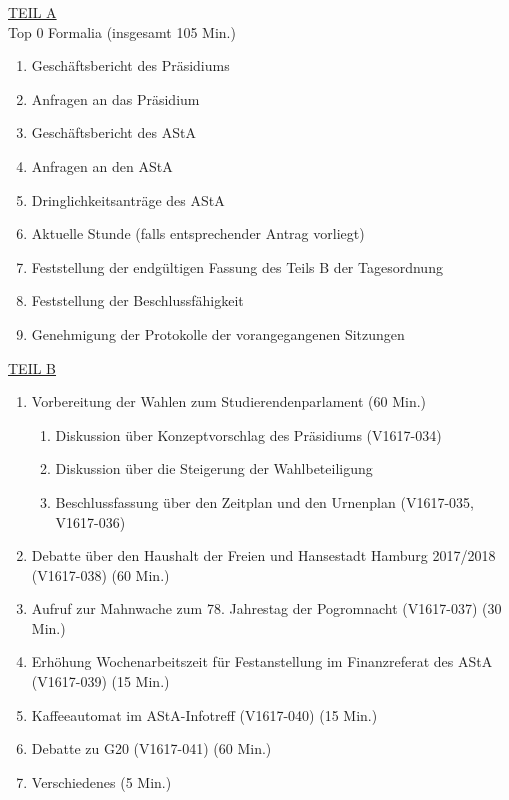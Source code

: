 \documentclass[ngerman,headheight=70pt]{scrartcl}
\begin{document}
    \underline{TEIL A}\\
    Top 0 Formalia (insgesamt 105 Min.)
    \begin{enumerate}
        \item Geschäftsbericht des Präsidiums
        \item Anfragen an das Präsidium
        \item Geschäftsbericht des AStA
        \item Anfragen an den AStA
        \item Dringlichkeitsanträge des AStA
        \item Aktuelle Stunde (falls entsprechender Antrag vorliegt)
        \item Feststellung der endgültigen Fassung des Teils B der Tagesordnung
        \item Feststellung der Beschlussfähigkeit
        \item Genehmigung der Protokolle der vorangegangenen Sitzungen
    \end{enumerate}
    \underline{TEIL B}\\
    \begin{enumerate}[label={\textbf{Top \theenumi}},leftmargin=*]
        \item Vorbereitung der Wahlen zum Studierendenparlament (60 Min.)
        \begin{enumerate}
            \item Diskussion über Konzeptvorschlag des Präsidiums (V1617-034)
            \item Diskussion über die Steigerung der Wahlbeteiligung
            \item Beschlussfassung über den Zeitplan und den Urnenplan
            (V1617-035, V1617-036)
        \end{enumerate}
        \item Debatte über den Haushalt der Freien und Hansestadt Hamburg
              2017/2018 (V1617-038) (60 Min.)
        \item Aufruf zur Mahnwache zum 78. Jahrestag der Pogromnacht (V1617-037) (30 Min.)
        \item Erhöhung Wochenarbeitszeit für Festanstellung im Finanzreferat des AStA (V1617-039) (15 Min.)
        \item Kaffeeautomat im AStA-Infotreff (V1617-040) (15 Min.)
        \item Debatte zu G20 (V1617-041) (60 Min.)
        \item Verschiedenes (5 Min.)
    \end{enumerate}
\end{document}
